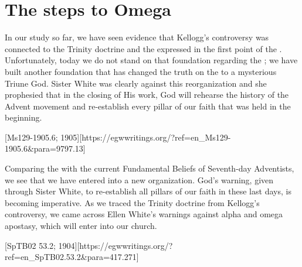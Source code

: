 \chapter{The steps to Omega}

In our study so far, we have seen evidence that Kellogg’s controversy was connected to the Trinity doctrine and the  expressed in the first point of the . Unfortunately, today we do not stand on that foundation regarding the ; we have built another foundation that has changed the truth on the  to a mysterious Triune God. Sister White was clearly against this reorganization and she prophesied that in the closing of His work, God will rehearse the history of the Advent movement and re-establish every pillar of our faith that was held in the beginning.

[Ms129-1905.6; 1905][https://egwwritings.org/?ref=en\_Ms129-1905.6&para=9797.13]

Comparing the  with the current Fundamental Beliefs of Seventh-day Adventists, we see that we have entered into a new organization. God’s warning, given through Sister White, to re-establish all pillars of our faith in these last days, is becoming imperative. As we traced the Trinity doctrine from Kellogg's controversy, we came across Ellen White’s warnings against alpha and omega apostasy, which will enter into our church.

[SpTB02 53.2; 1904][https://egwwritings.org/?ref=en\_SpTB02.53.2&para=417.271]

